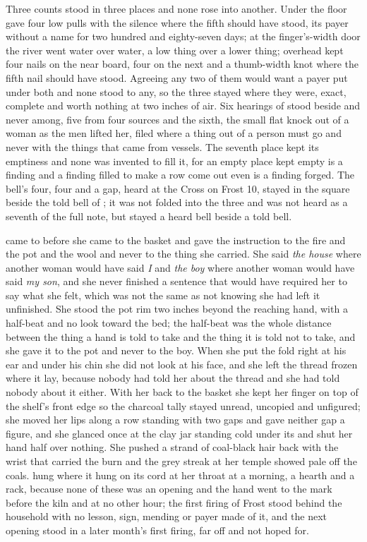 Three counts stood in three places and none rose into another. Under the floor  gave four low pulls with the silence where the fifth should have stood, its payer without a name for two hundred and eighty-seven days; at the finger's-width door the river went water over water, a low thing over a lower thing; overhead  kept four nails on the near board, four on the next and a thumb-width knot where the fifth nail should have stood. Agreeing any two of them would want a payer put under both and none stood to any, so the three stayed where they were, exact, complete and worth nothing at two inches of air. Six hearings of  stood beside and never among, five from four sources and the sixth, the small flat knock out of a woman as the men lifted her, filed where a thing out of a person must go and never with the things that came from vessels. The seventh place kept its emptiness and none was invented to fill it, for an empty place kept empty is a finding and a finding filled to make a row come out even is a finding forged. The bell's four, four and a gap, heard at the Cross on Frost 10, stayed in the square beside the told bell of ; it was not folded into the three and was not heard as a seventh of the full note, but stayed a heard bell beside a told bell.

\scenebreak

 came to  before she came to the basket and gave the instruction to the fire and the pot and the wool and never to the thing she carried. She said \emph{the house} where another woman would have said \emph{I} and \emph{the boy} where another woman would have said \emph{my son}, and she never finished a sentence that would have required her to say what she felt, which was not the same as not knowing she had left it unfinished. She stood the pot rim two inches beyond the reaching hand, with a half-beat and no look toward the bed; the half-beat was the whole distance between the thing a hand is told to take and the thing it is told not to take, and she gave it to the pot and never to the boy. When she put the fold right at his ear and under his chin she did not look at his face, and she left the thread frozen where it lay, because nobody had told her about the thread and she had told nobody about it either. With her back to the basket she kept her finger on top of the shelf's front edge so the charcoal tally stayed unread, uncopied and unfigured; she moved her lips along a row standing with two gaps and gave neither gap a figure, and she glanced once at the clay jar standing cold under its  and shut her hand half over nothing. She pushed a strand of coal-black hair back with the wrist that carried the burn and the grey streak at her temple showed pale off the coals.  hung where it hung on its cord at her throat at a morning, a hearth and a rack, because none of these was an opening and the hand went to the mark before the kiln and at no other hour; the first firing of Frost stood behind the household with no lesson, sign, mending or payer made of it, and the next opening stood in a later month's first firing, far off and not hoped for.

